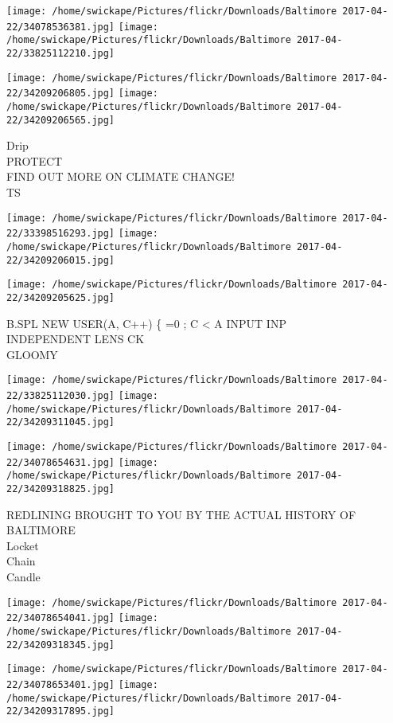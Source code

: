 \documentclass[10pt,letterpaper]{article}
\begin{document}
\texttt{[image: /home/swickape/Pictures/flickr/Downloads/Baltimore 2017-04-22/34078536381.jpg]}
\texttt{[image: /home/swickape/Pictures/flickr/Downloads/Baltimore 2017-04-22/33825112210.jpg]}

\texttt{[image: /home/swickape/Pictures/flickr/Downloads/Baltimore 2017-04-22/34209206805.jpg]}
\texttt{[image: /home/swickape/Pictures/flickr/Downloads/Baltimore 2017-04-22/34209206565.jpg]}

Drip\\
PROTECT\\
FIND OUT MORE ON CLIMATE CHANGE!\\
TS
\pagebreak

\texttt{[image: /home/swickape/Pictures/flickr/Downloads/Baltimore 2017-04-22/33398516293.jpg]}
\texttt{[image: /home/swickape/Pictures/flickr/Downloads/Baltimore 2017-04-22/34209206015.jpg]}

\vspace{0.25in}
\texttt{[image: /home/swickape/Pictures/flickr/Downloads/Baltimore 2017-04-22/34209205625.jpg]}

B.SPL NEW USER(A,  C++)  \{   =0 ; C < A INPUT INP\\
INDEPENDENT LENS CK\\
GLOOMY
\pagebreak

\texttt{[image: /home/swickape/Pictures/flickr/Downloads/Baltimore 2017-04-22/33825112030.jpg]}
\texttt{[image: /home/swickape/Pictures/flickr/Downloads/Baltimore 2017-04-22/34209311045.jpg]}

\texttt{[image: /home/swickape/Pictures/flickr/Downloads/Baltimore 2017-04-22/34078654631.jpg]}
\texttt{[image: /home/swickape/Pictures/flickr/Downloads/Baltimore 2017-04-22/34209318825.jpg]}

REDLINING BROUGHT TO YOU BY THE ACTUAL HISTORY OF BALTIMORE\\
Locket\\
Chain\\
Candle
\pagebreak

\texttt{[image: /home/swickape/Pictures/flickr/Downloads/Baltimore 2017-04-22/34078654041.jpg]}
\texttt{[image: /home/swickape/Pictures/flickr/Downloads/Baltimore 2017-04-22/34209318345.jpg]}

\texttt{[image: /home/swickape/Pictures/flickr/Downloads/Baltimore 2017-04-22/34078653401.jpg]}
\texttt{[image: /home/swickape/Pictures/flickr/Downloads/Baltimore 2017-04-22/34209317895.jpg]}
\end{document}

